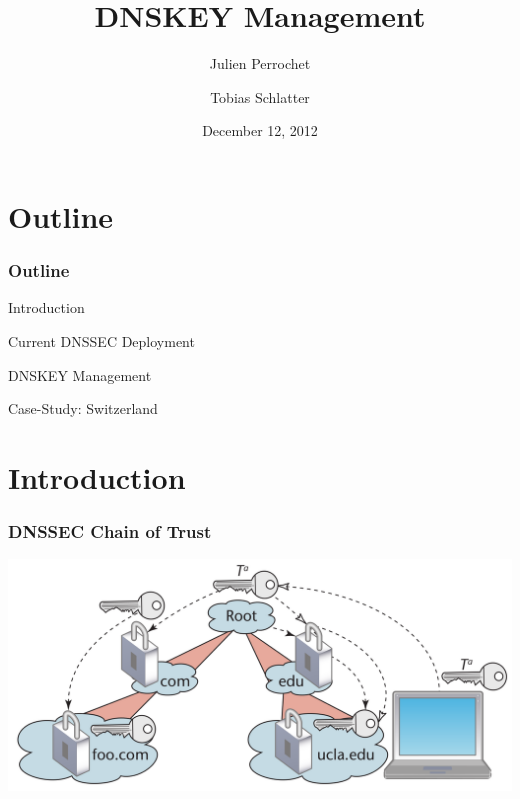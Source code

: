 \documentclass{beamer}
\title{DNSKEY Management}
\author{Julien Perrochet \and Tobias Schlatter}
\date{December 12, 2012}
\institute{ITSEC, EPFL, Prof. Janson}
\begin{document}
\begin{frame}
  \titlepage
\end{frame}

\section{Outline}
\begin{frame}
  \frametitle{Outline}

  \begin{block}{Introduction}
  \end{block}

  \begin{block}{Current DNSSEC Deployment}
  \end{block}

  \begin{block}{DNSKEY Management}
  \end{block}

  \begin{block}{Case-Study: Switzerland}
  \end{block}

\end{frame}

\section{Introduction}
\begin{frame}
  \frametitle{DNSSEC Chain of Trust}

  \includegraphics[width=\textwidth]{trust-chain}

\end{frame}
\end{document}
